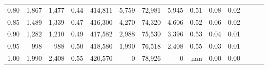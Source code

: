 \begin{tabular}{rrrrrrrrrrrrrr}
0.80 &   1,867 &  1,477 &  0.44 &  414,811 &    5,759 &  72,981 &   5,945 &  0.51 &  0.08 &      0.02 \\
0.85 &   1,489 &  1,339 &  0.47 &  416,300 &    4,270 &  74,320 &   4,606 &  0.52 &  0.06 &      0.02 \\
0.90 &   1,282 &  1,210 &  0.49 &  417,582 &    2,988 &  75,530 &   3,396 &  0.53 &  0.04 &      0.01 \\
0.95 &     998 &    988 &  0.50 &  418,580 &    1,990 &  76,518 &   2,408 &  0.55 &  0.03 &      0.01 \\
1.00 &   1,990 &  2,408 &  0.55 &  420,570 &        0 &  78,926 &       0 &   nan &  0.00 &      0.00 \\
\bottomrule
\end{tabular}
